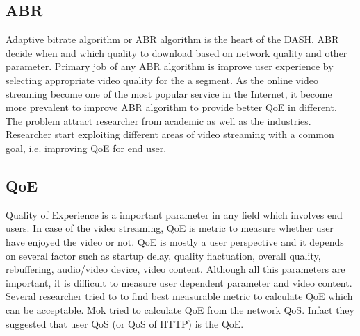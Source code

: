 \subsection{ABR}
Adaptive bitrate algorithm or ABR algorithm is the heart of the DASH. ABR decide when and which quality to download based on network quality and other parameter. Primary job of any ABR algorithm is improve user experience by selecting appropriate video quality for the a segment. As the online video streaming become one of the most popular service in the Internet, it become more prevalent to improve ABR algorithm to provide better QoE in different. The problem attract researcher from academic as well as the industries. Researcher start exploiting different areas of video streaming with a common goal, i.e. improving QoE for end user.

\subsection{QoE}
Quality of Experience is a important parameter in any field which involves end users. In case of the video streaming, QoE is metric to measure whether user have enjoyed the video or not. QoE is mostly a user perspective and it depends on several factor such as startup delay, quality flactuation, overall quality, rebuffering, audio/video device, video content. Although all this parameters are important, it is difficult to measure user dependent parameter and video content. Several researcher tried to to find best measurable metric to calculate QoE which can be acceptable. Mok \etal \cite{5990550} tried to calculate QoE from the network QoS. Infact they suggested that user QoS (or QoS of HTTP) is the QoE. 

